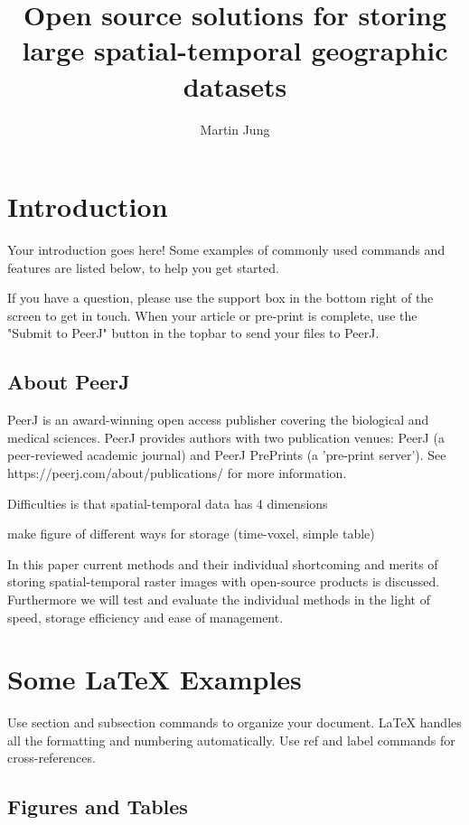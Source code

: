 \documentclass[fleqn,10pt]{wlpeerj}
\title{Open source solutions for storing large spatial-temporal geographic datasets}
\author[1]{Martin Jung}
\affil[1]{Center for Macroecology and Evolution University of Copenhagen Universitetsparken 15 DK-2100 Copenhagen}
\affil[1]{Address now: }
\begin{document}
\flushbottom
\maketitle
\thispagestyle{empty}

\section*{Introduction}

Your introduction goes here! Some examples of commonly used commands and features are listed below, to help you get started.

If you have a question, please use the support box in the bottom right of the screen to get in touch. When your article or pre-print is complete, use the "Submit to PeerJ" button in the topbar to send your files to PeerJ.

\subsection*{About PeerJ}

PeerJ is an award-winning open access publisher covering the biological and medical sciences.  PeerJ provides authors with two publication venues: PeerJ (a peer-reviewed academic journal) and PeerJ PrePrints (a 'pre-print server'). See https://peerj.com/about/publications/ for more information.


Difficulties is that spatial-temporal data has 4 dimensions

make figure of different ways for storage (time-voxel, simple table)


In this paper current methods and their individual shortcoming and merits of storing spatial-temporal raster images with open-source products is discussed. 
Furthermore we will test and evaluate the individual methods in the light of speed, storage efficiency and ease of management.


\section*{Some \LaTeX{} Examples}
\label{sec:examples}

Use section and subsection commands to organize your document. \LaTeX{} handles all the formatting and numbering automatically. Use ref and label commands for cross-references.

\subsection*{Figures and Tables}
\end{document}
